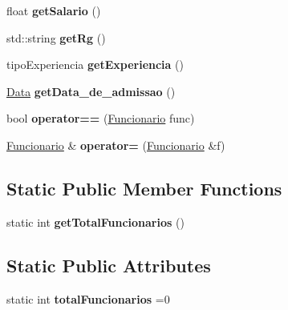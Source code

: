 \begin{DoxyCompactItemize}
float {\bfseries get\+Salario} ()
\item 
\mbox{\label{classFuncionario_a7e015dabe504d58913e12e84d5290fd6}} 
std\+::string {\bfseries get\+Rg} ()
\item 
\mbox{\label{classFuncionario_aa7f6aafc74d449ca2ec8a3a41d1e902c}} 
tipo\+Experiencia {\bfseries get\+Experiencia} ()
\item 
\mbox{\label{classFuncionario_a41044ba20a78e656594ab4f0eb1061ac}} 
\hyperlink{classData}{Data} {\bfseries get\+Data\+\_\+de\+\_\+admissao} ()
\item 
\mbox{\label{classFuncionario_a647023a4db6ed079a13af45610229bdc}} 
bool {\bfseries operator==} (\hyperlink{classFuncionario}{Funcionario} func)
\item 
\mbox{\label{classFuncionario_a0a594ee7bbe39e22a277e58b9fb01767}} 
\hyperlink{classFuncionario}{Funcionario} \& {\bfseries operator=} (\hyperlink{classFuncionario}{Funcionario} \&f)
\end{DoxyCompactItemize}
\subsection*{Static Public Member Functions}
\begin{DoxyCompactItemize}
\item 
\mbox{\label{classFuncionario_ad7fa9b6f7bc84067ccdd1b1252cfd9a3}} 
static int {\bfseries get\+Total\+Funcionarios} ()
\end{DoxyCompactItemize}
\subsection*{Static Public Attributes}
\begin{DoxyCompactItemize}
\item 
\mbox{\label{classFuncionario_a54d4ad641d7da5552e9f45433751fb7e}} 
static int {\bfseries total\+Funcionarios} =0
\end{DoxyCompactItemize}
